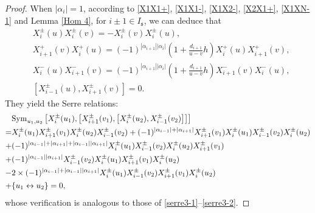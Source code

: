 \documentclass[a4paper,12pt]{article}
\numberwithin{equation}{section}
\begin{document}
\begin{proof}
When $|\alpha_{i}|=1$, according to \eqref{X1X1+}, \eqref{X1X1-}, \eqref{X1X2-}, \eqref{X2X1+}, \eqref{X1XN-1} and Lemma \ref{Hom 4}, for $i\pm1\in I_{\mathfrak{s}}$, we can deduce that
\begin{align*}
&X_{i}^{\pm}(u)X_{i}^{\pm}(v)=-X_{i}^{\pm}(v)X_{i}^{\pm}(u),\\ 
&X_{i+1}^{+}(v)X_{i}^{+}(u)=(-1)^{|\alpha_{i+1}||\alpha_{i}|}\left(1+\frac{d_{i+1}}{u-v}h\right)X_{i}^{+}(u)X_{i+1}^{+}(v),\\
&X_{i}^{-}(u)X_{i+1}^{-}(v)=(-1)^{|\alpha_{i+1}||\alpha_{i}|}\left(1+\frac{d_{i+1}}{u-v}h\right)X_{i+1}^{-}(v)X_{i}^{-}(u),\\ 
&\left[X_{i-1}^{\pm}(u),X_{i+1}^{\pm}(v)\right]=0.
\end{align*}
They yield the Serre relations:
\begin{align*}
&{\rm Sym}_{u_{1},u_{2}}\left[X_{i}^{\pm}(u_{1}),\left[X_{i+1}^{\pm}(v_{1}),\left[X_{i}^{\pm}(u_{2}), X_{i-1}^{\pm}(v_{2})\right]\right]\right]\\ 
=&X_{i}^{\pm}(u_{1})X_{i+1}^{\pm}(v_{1})X_{i}^{\pm}(u_{2})X_{i-1}^{\pm}(v_{2})+(-1)^{|\alpha_{i-1}|+|\alpha_{i+1}|}X_{i+1}^{\pm}(v_{1})X_{i}^{\pm}(u_{1})
X_{i-1}^{\pm}(v_{2})X_{i}^{\pm}(u_{2})\\
+&(-1)^{|\alpha_{i-1}|+|\alpha_{i+1}|+|\alpha_{i-1}||\alpha_{i+1}|}X_{i}^{\pm}(u_{1})
X_{i-1}^{\pm}(v_{2})X_{i}^{\pm}(u_{2})X_{i+1}^{\pm}(v_{1})\\ 
+&(-1)^{|\alpha_{i-1}|
|\alpha_{i+1}|}X_{i-1}^{\pm}(v_{2})X_{i}^{\pm}(u_{1})X_{i+1}^{\pm}(v_{1})
X_{i}^{\pm}(u_{2})\\ 
-&2\times(-1)^{|\alpha_{i-1}|+|\alpha_{i-1}||\alpha_{i+1}|}X_{i}^{\pm}(u_{1})
X_{i-1}^{\pm}(v_{2})X_{i+1}^{\pm}(v_{1})X_{i}^{\pm}(u_{2})\\
+&\{u_{1}\leftrightarrow u_{2}\}=0,
\end{align*}
whose verification is analogous to those of \eqref{serre3-1}–\eqref{serre3-2}.
\end{proof}
\end{document}
